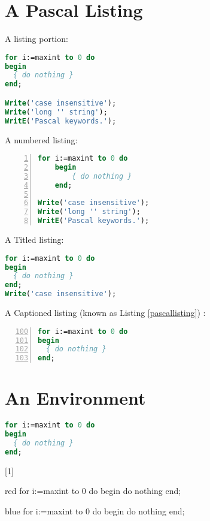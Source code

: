 \documentclass{article}
\begin{document}
\section{A Pascal Listing}
A listing portion:
\begin{lstlisting}[language=Pascal,firstline=2,lastline=5,caption={}]
for i:=maxint to 0 do
begin
  { do nothing }
end;

Write('case insensitive');
Write('long '' string');
WritE('Pascal keywords.');
\end{lstlisting}

A numbered listing:
\begin{lstlisting}[language=Pascal,numbers=left, numberstyle=\tiny, stepnumber=2,stringstyle=\color{red}\ttfamily,showspaces,tabsize=4]
for i:=maxint to 0 do
	begin
		{ do nothing }
	end;

Write('case insensitive');
Write('long '' string');
WritE('Pascal keywords.');
\end{lstlisting}

A Titled listing:
\begin{lstlisting}[language=Pascal,title={A bit of Pascal}]
for i:=maxint to 0 do
begin
  { do nothing }
end;
Write('case insensitive');
\end{lstlisting}


A Captioned listing (known as Listing \ref{pascallisting}) :
\begin{lstlisting}[language=Pascal,caption=Another bit of Pascal, label=pascallisting,firstnumber=100,numbers=left]
for i:=maxint to 0 do
begin
  { do nothing }
end;
\end{lstlisting}

\section{An Environment}
\begin{lstlisting}[language=Pascal]
for i:=maxint to 0 do
begin
  { do nothing }
end;
\end{lstlisting}

[1]{}{}
\begin{colored}{red}
for i:=maxint to 0 do
begin
  { do nothing }
end;
\end{colored}

\begin{colored}{blue}
for i:=maxint to 0 do
begin
  { do nothing }
end;
\end{colored}
\end{document}
